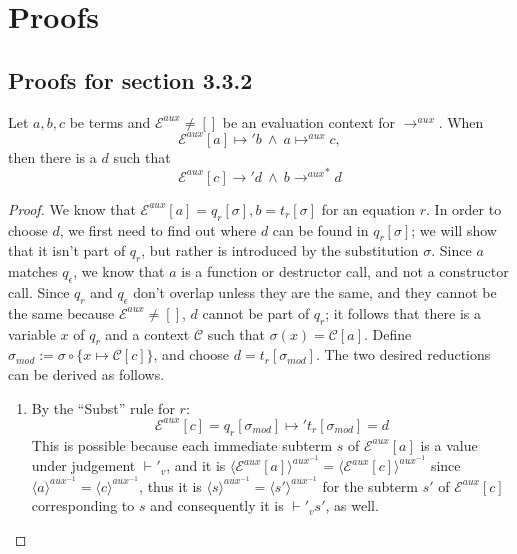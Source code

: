 \chapter{Proofs}

\section{Proofs for section 3.3.2}

\begin{lemma}
\label{lem:app1}
Let $a, b, c$ be terms and $\mathcal{E}^{aux} \neq []$ be an evaluation context for $\longrightarrow^{aux}$. When
\[
\mathcal{E}^{aux}[a] \mapsto' b  ~ \land ~ a \mapsto^{aux} c,
\]
then there is a $d$ such that
\[
\mathcal{E}^{aux}[c] \longrightarrow' d ~ \land ~ b {\longrightarrow^{aux}}^* d
\]
\begin{proof}
We know that $\mathcal{E}^{aux}[a] = q_r[\sigma], b = t_r[\sigma]$ for an equation $r$. In order to choose $d$, we first need to find out where $d$ can be found in $q_r[\sigma]$; we will show that it isn't part of $q_r$, but rather is introduced by the substitution $\sigma$. Since $a$ matches $q_\epsilon$, we know that $a$ is a function or destructor call, and not a constructor call. Since $q_r$ and $q_\epsilon$ don't overlap unless they are the same, and they cannot be the same because $\mathcal{E}^{aux} \neq []$, $d$ cannot be part of $q_r$; it follows that there is a variable $x$ of $q_r$ and a context $\mathcal{C}$ such that $\sigma(x) = \mathcal{C}[a]$. Define $\sigma_{mod} := \sigma \circ \{x \mapsto \mathcal{C}[c]\}$, and choose $d = t_r[\sigma_{mod}]$. The two desired reductions can be derived as follows.
\begin{enumerate}
\item By the ``Subst'' rule for $r$:
\[
\mathcal{E}^{aux}[c] = q_r[\sigma_{mod}] \mapsto' t_r[\sigma_{mod}] = d
\]
This is possible because each immediate subterm $s$ of $\mathcal{E}^{aux}[a]$ is a value under judgement $\vdash'_v$, and it is $\langle \mathcal{E}^{aux}[a] \rangle^{aux^{-1}} = \langle \mathcal{E}^{aux}[c] \rangle^{aux^{-1}}$ since $\langle a \rangle^{aux^{-1}} = \langle c \rangle^{aux^{-1}}$, thus it is $\langle s \rangle^{aux^{-1}} = \langle s' \rangle^{aux^{-1}}$ for the subterm $s'$ of $\mathcal{E}^{aux}[c]$ corresponding to $s$ and consequently it is $\vdash'_v s'$, as well.


\end{enumerate}
\end{proof}
\end{lemma}
